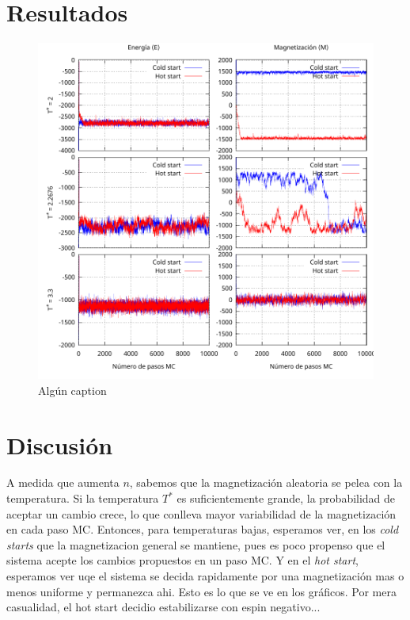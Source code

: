 \documentclass[a4paper,12pt]{article}
\begin{document}
\section{Resultados}

\begin{figure}
    \centering
    \includegraphics[width = \textwidth]{../img/a.pdf}
    \caption{Algún caption}
    \label{fig:a}
\end{figure}

\section{Discusión}

A medida que aumenta $n$, sabemos que la magnetización aleatoria se pelea con la temperatura. Si la temperatura $T^*$ es suficientemente grande, la probabilidad de aceptar un cambio crece, lo que conlleva mayor variabilidad de la magnetización en cada paso MC. Entonces, para temperaturas bajas, esperamos ver, en los {\it cold starts} que la magnetizacion general se mantiene, pues es poco propenso que el sistema acepte los cambios propuestos en un paso MC. Y en el {\it hot start}, esperamos ver uqe el sistema se decida rapidamente por una magnetización mas o menos uniforme y permanezca ahi. Esto es lo que se ve en los gráficos. Por mera casualidad, el hot start decidio estabilizarse con espin negativo...
\end{document}
